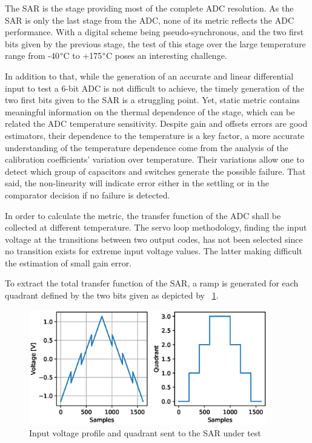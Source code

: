 The SAR is the stage providing most of the complete ADC resolution. As the SAR is only the last stage from the ADC, none of its metric reflects the ADC performance. With a digital scheme being pseudo-synchronous, and the two first bits given by the previous stage, the test of this stage over the large temperature range from -40\(\degree \)C to +175\(\degree \)C poses an interesting challenge.

In addition to that, while the generation of an accurate and linear differential input to test a 6-bit ADC is not difficult to achieve, the timely generation of the two first bits given to the SAR is a struggling point. Yet, static metric contains meaningful information on the thermal dependence of the stage, which can be related the ADC temperature sensitivity. Despite gain and offsets errors are good estimators, their dependence to the temperature is a key factor, a more accurate understanding of the temperature dependence come from the analysis of the calibration coefficients' variation over temperature. Their variations allow one to detect which group of capacitors and switches generate the possible failure. That said, the non-linearity will indicate error either in the settling or in the comparator decision if no failure is detected.

In order to calculate the metric, the transfer function of the ADC shall be collected at different temperature. The servo loop methodology, finding the input voltage at the transitions between two output codes, has not been selected since no transition exists for extreme input voltage values. The latter making difficult the estimation of small gain error.

To extract the total transfer function of the SAR, a ramp is generated for each quadrant defined by the two bits given as depicted by \figurename~\ref{fig:sar-test-input}.

\begin{figure}[htp]
    \centering
    \includegraphics[height=5cm]{Chapter5/Figs/sar_test/sar-test-input.eps}
    \caption{Input voltage profile and quadrant sent to the SAR under test}
    \label{fig:sar-test-input}
\end{figure}

